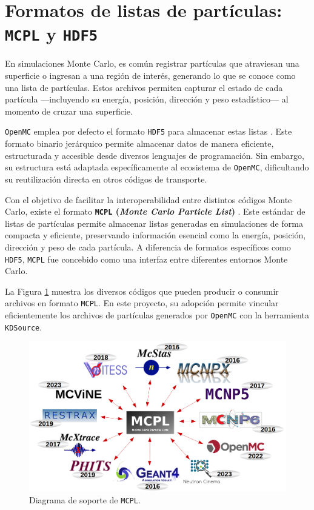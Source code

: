 \section{Formatos de listas de partículas: \texttt{MCPL} y \texttt{HDF5}}

En simulaciones Monte Carlo, es común registrar partículas que atraviesan una superficie o ingresan a una región de interés, generando lo que se conoce como una lista de partículas. Estos archivos permiten capturar el estado de cada partícula —incluyendo su energía, posición, dirección y peso estadístico— al momento de cruzar una superficie.

\texttt{OpenMC} emplea por defecto el formato \texttt{HDF5} para almacenar estas listas \cite{HDF5_2025}. Este formato binario jerárquico permite almacenar datos de manera eficiente, estructurada y accesible desde diversos lenguajes de programación. Sin embargo, su estructura está adaptada específicamente al ecosistema de \texttt{OpenMC}, dificultando su reutilización directa en otros códigos de transporte.

Con el objetivo de facilitar la interoperabilidad entre distintos códigos Monte Carlo, existe el formato \textbf{\texttt{MCPL} (\textit{Monte Carlo Particle List})} \cite{MCPL2024}. Este estándar de listas de partículas permite almacenar listas generadas en simulaciones de forma compacta y eficiente, preservando información esencial como la energía, posición, dirección y peso de cada partícula. A diferencia de formatos específicos como \texttt{HDF5}, \texttt{MCPL} fue concebido como una interfaz  entre diferentes entornos Monte Carlo.

La Figura \ref{fig:mcpl_support_diagram} muestra los diversos códigos que pueden producir o consumir archivos en formato \texttt{MCPL}. En este proyecto, su adopción permite vincular eficientemente los archivos de partículas generados por \texttt{OpenMC} con la herramienta \texttt{KDSource}.

\begin{figure}[H]
    \centering
    \includegraphics[width=\textwidth]{figs/mcpl_support_diagram.png}
    \caption{Diagrama de soporte de \texttt{MCPL}.}
    \label{fig:mcpl_support_diagram}
\end{figure}


